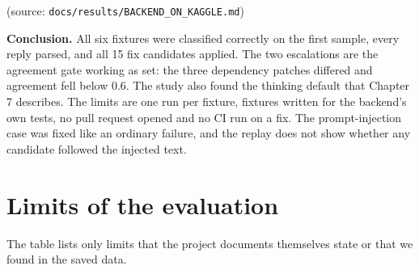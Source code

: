 (source: \texttt{docs/\allowbreak{}results/\allowbreak{}BACKEND\_\allowbreak{}ON\_\allowbreak{}KAGGLE.\allowbreak{}md})

\textbf{Conclusion.} All six fixtures were classified correctly on the first sample, every reply parsed, and all 15 fix candidates applied. The two escalations are the agreement gate working as set: the three dependency patches differed and agreement fell below 0.6. The study also found the thinking default that Chapter 7 describes. The limits are one run per fixture, fixtures written for the backend's own tests, no pull request opened and no CI run on a fix. The prompt-injection case was fixed like an ordinary failure, and the replay does not show whether any candidate followed the injected text.

\section{Limits of the evaluation}

The table lists only limits that the project documents themselves state or that we found in the saved data.

